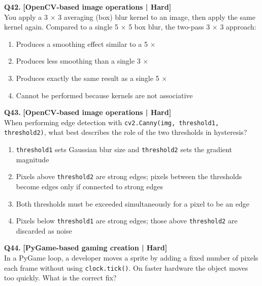 \noindent\textbf{Q42.} \hfill {\small\color{LPUOrange}\textbf{[OpenCV-based image operations | Hard]}}\\[2pt]
You apply a 3 $\times$ 3 averaging (box) blur kernel to an image, then apply the same kernel again. Compared to a single 5 $\times$ 5 box blur, the two-pass 3 $\times$ 3 approach:

\begin{enumerate}[label=(\alph*),topsep=2pt,itemsep=1pt,partopsep=0pt,parsep=0pt]
    \item \relax Produces a smoothing effect similar to a 5 $\times$
    \item \relax Produces less smoothing than a single 3 $\times$
    \item \relax Produces exactly the same result as a single 5 $\times$
    \item \relax Cannot be performed because kernels are not associative
\end{enumerate}
\vspace{2mm}

\noindent\textbf{Q43.} \hfill {\small\color{LPUOrange}\textbf{[OpenCV-based image operations | Hard]}}\\[2pt]
When performing edge detection with \texttt{cv2.Canny(img, threshold1, threshold2)}, what best describes the role of the two thresholds in hysteresis?

\begin{enumerate}[label=(\alph*),topsep=2pt,itemsep=1pt,partopsep=0pt,parsep=0pt]
    \item \relax \texttt{threshold1} sets Gaussian blur size and \texttt{threshold2} sets the gradient magnitude
    \item \relax Pixels above \texttt{threshold2} are strong edges; pixels between the thresholds become edges only if connected to strong edges
    \item \relax Both thresholds must be exceeded simultaneously for a pixel to be an edge
    \item \relax Pixels below \texttt{threshold1} are strong edges; those above \texttt{threshold2} are discarded as noise
\end{enumerate}
\vspace{2mm}

\noindent\textbf{Q44.} \hfill {\small\color{LPUOrange}\textbf{[PyGame-based gaming creation | Hard]}}\\[2pt]
In a PyGame loop, a developer moves a sprite by adding a fixed number of pixels each frame without using \texttt{clock.tick()}. On faster hardware the object moves too quickly. What is the correct fix?

